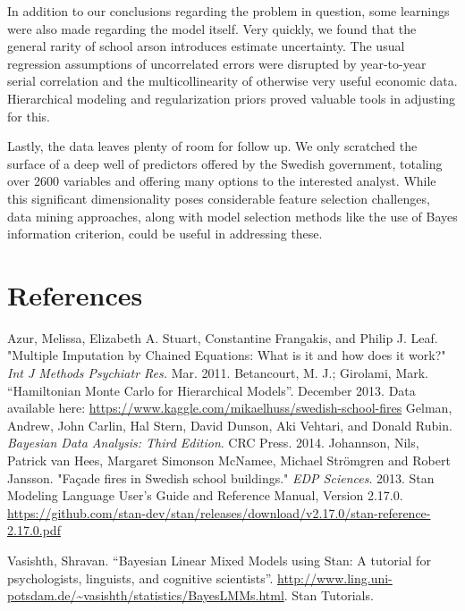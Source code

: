 \documentclass[10pt,a4paper, hidelinks]{article} %
\begin{document}
In addition to our conclusions regarding the problem in question, some learnings were also made regarding the model itself.  Very quickly, we found that the general rarity of school arson introduces estimate uncertainty.  The usual regression assumptions of uncorrelated errors were disrupted by year-to-year serial correlation and the multicollinearity of otherwise very useful economic data. Hierarchical modeling and regularization priors proved valuable tools in adjusting for this.

Lastly, the data leaves plenty of room for follow up.  We only scratched the surface of a deep well of predictors offered by the Swedish government, totaling over 2600 variables and offering many options to the interested analyst.  While this significant dimensionality poses considerable feature selection challenges, data mining approaches, along with model selection methods like the use of Bayes information criterion, could be useful in addressing these. 


\section{References}

\begingroup
\renewcommand{\section}[2]{}

\begin{thebibliography}{depth}
	Azur, Melissa, Elizabeth A. Stuart, Constantine Frangakis, and Philip J. Leaf. "Multiple Imputation by Chained Equations: What is it and how does it work?" \textit{Int J Methods Psychiatr Res.} Mar. 2011.
	Betancourt, M. J.; Girolami, Mark. ``Hamiltonian Monte Carlo for Hierarchical Models''. December 2013.
	Data available here: \url{https://www.kaggle.com/mikaelhuss/swedish-school-fires}
	Gelman, Andrew, John Carlin, Hal Stern, David Dunson, Aki Vehtari, and Donald Rubin. \textit{Bayesian Data Analysis: Third Edition}. CRC Press. 2014.
	Johannson, Nils, Patrick van Hees, Margaret Simonson McNamee, Michael Str{\"o}mgren and Robert Jansson. "Fa{\c c}ade fires in Swedish school buildings." \textit{EDP Sciences}. 2013.
 	Stan Modeling Language User's Guide and Reference Manual, Version 2.17.0. \url{https://github.com/stan-dev/stan/releases/download/v2.17.0/stan-reference-2.17.0.pdf} 

	Vasishth, Shravan. ``Bayesian Linear Mixed Models using Stan: A tutorial for psychologists, linguists, and cognitive scientists''. \url{http://www.ling.uni-potsdam.de/~vasishth/statistics/BayesLMMs.html}. Stan Tutorials.
    
    
\end{thebibliography}
\end{document}
